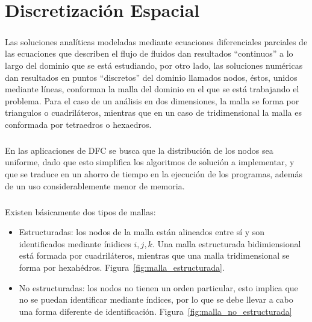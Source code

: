\documentclass[letterpaper, openright, 12pt]{book}
\begin{document}
%
%
%
%
%

%
%
%
%
\chapter{Discretización Espacial}\label{chap:discretizacion-espacial}
    \paragraph*{}
    Las soluciones analíticas modeladas mediante ecuaciones diferenciales
    parciales de las ecuaciones que describen el flujo de fluidos dan
    resultados ``continuos'' a lo largo del dominio que se está estudiando, por
    otro lado, las soluciones numéricas  dan resultados en puntos ``discretos''
    del dominio llamados nodos, éstos, unidos mediante líneas, conforman la
    malla del dominio en el que se está trabajando el problema. Para el caso de
    un análisis en dos dimensiones, la malla se forma por triangulos o
    cuadriláteros, mientras que en un caso de tridimensional la malla es
    conformada por tetraedros o hexaedros.

    \paragraph*{}
    En las aplicaciones de DFC se busca que la distribución de los nodos sea
    uniforme, dado que esto simplifica los algoritmos de solución a
    implementar, y que se traduce en un ahorro de tiempo en la ejecución de los
    programas, además de un uso considerablemente menor de memoria.

    \paragraph*{}
    Existen básicamente dos tipos de mallas:
    \begin{itemize}
    \item Estructuradas: los nodos de la malla están alineados entre sí y
      son identificados mediante ínidices $i, j, k$. Una malla estructurada
      bidimiensional está formada por cuadriláteros, mientras que una malla
      tridimensional se forma por hexahédros.
            Figura~\ref{fig:malla_estructurada}.
    \item No estructuradas: los nodos no tienen un orden particular, esto
      implica que no se puedan identificar mediante índices, por lo que se debe
      llevar a cabo una forma diferente de identificación.
            Figura~\ref{fig:malla_no_estructurada}
    \end{itemize}
\end{document}
